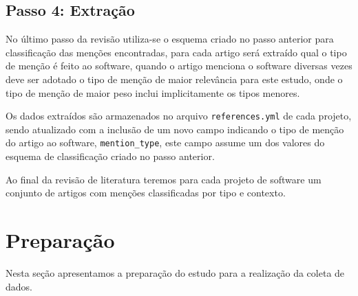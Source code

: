 
\subsection{Passo 4: Extração}

No último passo da revisão utiliza-se o esquema criado no passo anterior para
classificação das menções encontradas, para cada artigo será extraído qual o
tipo de menção é feito ao software, quando o artigo menciona o software
diversas vezes deve ser adotado o tipo de menção de maior relevância para este
estudo, onde o tipo de menção de maior peso inclui implicitamente os tipos
menores.


Os dados extraídos são armazenados no arquivo \texttt{references.yml} de
cada projeto, sendo atualizado com a inclusão de um novo campo indicando o tipo
de menção do artigo ao software, \texttt{mention\_type}, este campo assume um dos
valores do esquema de classificação criado no passo anterior.

Ao final da revisão de literatura teremos para cada projeto de software um
conjunto de artigos com menções classificadas por tipo e contexto.




\section{Preparação} \label{estudo2:preparacao} %

Nesta seção apresentamos a preparação do estudo para a realização da coleta de
dados.

